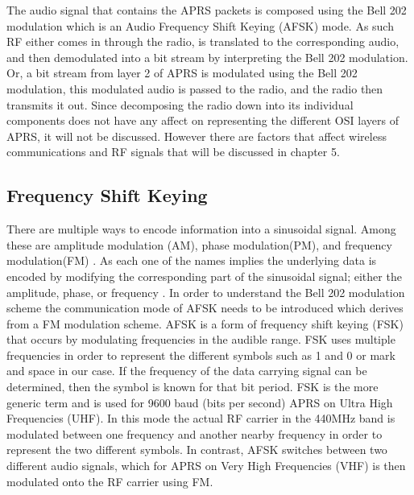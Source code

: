 The audio signal that contains the APRS packets is composed using the Bell 202 modulation which is an Audio Frequency Shift Keying (AFSK) mode. As such RF either comes in through the radio, is translated to the corresponding audio, and then demodulated into a bit stream by interpreting the Bell 202 modulation. Or, a bit stream from layer 2 of APRS is modulated using the Bell 202 modulation, this modulated audio is passed to the radio, and the radio then transmits it out. Since decomposing the radio down into its individual components does not have any affect on representing the different OSI layers of APRS, it will not be discussed. However there are factors that affect wireless communications and RF signals that will be discussed in chapter 5.

\subsection{Frequency Shift Keying}
There are multiple ways to encode information into a sinusoidal signal. Among these are amplitude modulation (AM), phase modulation(PM), and frequency modulation(FM) \cite{Goleniewski2006}. As each one of the names implies the underlying data is encoded by modifying the corresponding part of the sinusoidal signal; either the amplitude, phase, or frequency \cite{Instruments2014}. In order to understand the Bell 202 modulation scheme the communication mode of AFSK needs to be introduced which derives from a FM modulation scheme. AFSK is a form of frequency shift keying (FSK) that occurs by modulating frequencies in the audible range. FSK uses multiple frequencies in order to represent the different symbols such as 1 and 0 or mark and space in our case. If the frequency of the data carrying signal can be determined, then the symbol is known for that bit period. FSK is the more generic term and is used for 9600 baud (bits per second) APRS on Ultra High Frequencies (UHF). In this mode the actual RF carrier in the 440MHz band is modulated between one frequency and another nearby frequency in order to represent the two different symbols. In contrast, AFSK switches between two different audio signals, which for APRS on Very High Frequencies (VHF) is then modulated onto the RF carrier using FM.


